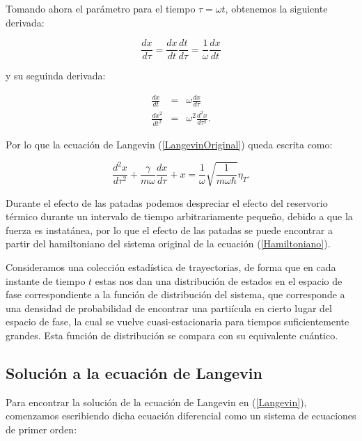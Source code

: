 \documentclass[letterpaper,12pt,oneside]{book}
\begin{document}
	Tomando ahora el par\'ametro para el tiempo $\tau=\omega t$, obtenemos la siguiente derivada:
	
	\begin{equation}
		\frac{dx}{d\tau} = \frac{dx}{dt}\frac{dt}{d\tau}
		= \frac{1}{\omega}\frac{dx}{dt}
	\end{equation}
	
	\noindent y su seguinda derivada:
	
	\begin{eqnarray}
	\frac{dx}{dt} & = & \omega\frac{dx}{d\tau} \nonumber\\ 
	\frac{dx^2}{dt^2} & = & \omega^2\frac{d^2 x}{d\tau^2}.
	\end{eqnarray}
	
	Por lo que la ecuaci\'on de Langevin (\ref{LangevinOriginal}) queda escrita como:
	
	\begin{equation}\label{Langevin}
		\frac{d^2x}{d\tau^2} + \frac{\gamma}{m\omega}\frac{dx}{d\tau} + x = \frac{1}{\omega}\sqrt{\frac{1}{m\omega\hbar}}\eta_T.
	\end{equation} 
	
	Durante el efecto de las patadas podemos despreciar el efecto del reservorio t\'ermico durante un intervalo de tiempo arbitrariamente pequeño, debido a que la fuerza es instat\'anea, por lo que el efecto de las patadas se puede encontrar a partir del hamiltoniano del sistema original de la ecuaci\'on (\ref{Hamiltoniano}).
	
	
	Consideramos una colecci\'on estad\'istica de trayectorias, de forma que en cada instante de tiempo $t$ estas nos dan una distribuci\'on de estados en el espacio de fase correspondiente a la funci\'on de distribuci\'on del sistema, que corresponde a una densidad de probabilidad de encontrar una parti\'icula en cierto lugar del espacio de fase, la cual se vuelve cuasi-estacionaria para tiempos suficientemente grandes. Esta funci\'on de distribuci\'on se compara con su equivalente cu\'antico.
	
	\subsection{Soluci\'on a la ecuaci\'on de Langevin}
	
	Para encontrar la soluci\'on de la ecuaci\'on de Langevin en (\ref{Langevin}), comenzamos escribiendo dicha ecuaci\'on diferencial como un sistema de ecuaciones de primer orden:
	
\end{document}
